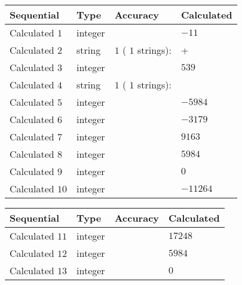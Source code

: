 \documentclass[12pt]{article}
\begin{document}
  
\noindent\begin{tabular}{|l|l|l|l|}
\hline
 Sequential & Type & Accuracy & Calculated \\ 
\hline
 
 
  Calculated $            1 $ & integer &  & 
  $ -11 $ 
 \\  \hline  
 
 
  Calculated $            2 $ & string & $            1  $ ( $           1  $ strings): 
 & +
 \\  \hline  
 
 
  Calculated $            3 $ & integer &  & 
  $ 539 $ 
 \\  \hline  
 
 
  Calculated $            4 $ & string & $            1  $ ( $           1  $ strings): 
 & 
 \\  \hline  
 
 
  Calculated $            5 $ & integer &  & 
  $ -5984 $ 
 \\  \hline  
 
 
  Calculated $            6 $ & integer &  & 
  $ -3179 $ 
 \\  \hline  
 
 
  Calculated $            7 $ & integer &  & 
  $ 9163 $ 
 \\  \hline  
 
 
  Calculated $            8 $ & integer &  & 
  $ 5984 $ 
 \\  \hline  
 
 
  Calculated $            9 $ & integer &  & 
  $ 0 $ 
 \\  \hline  
 
 
  Calculated $           10 $ & integer &  & 
  $ -11264 $ 
 \\  \hline  
 \end{tabular}
   
   
  
  
\noindent\begin{tabular}{|l|l|l|l|}
\hline
 Sequential & Type & Accuracy & Calculated \\ 
\hline
 
 
  Calculated $           11 $ & integer &  & 
  $ 17248 $ 
 \\  \hline  
 
 
  Calculated $           12 $ & integer &  & 
  $ 5984 $ 
 \\  \hline  
 
 
  Calculated $           13 $ & integer &  & 
  $ 0 $ 
 \\  \hline  
 \end{tabular}
   
\end{document}
